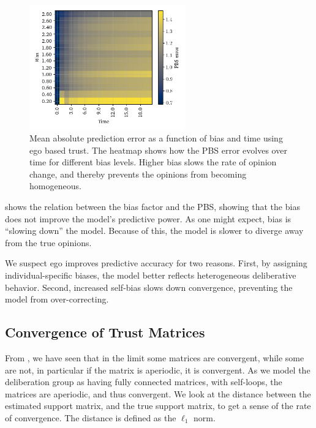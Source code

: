 \begin{figure}[ht]
	\centering

	\includegraphics[width=0.6\textwidth]{Figures/bias_time_imshow.png}
	\hspace{1em}
	\caption{Mean absolute prediction error as a function of bias and time using ego based trust. The heatmap shows how the PBS error evolves over time for different bias levels. Higher bias slows the rate of opinion change, and thereby prevents the opinions from becoming homogeneous.}
	\label{fig:bias_slowdown}
\end{figure}

 shows the relation between the bias factor and the
PBS, showing that the bias does not improve the model's predictive power. As
one might expect, bias is ``slowing down'' the model. Because of this, the
model is slower to diverge away from the true opinions.


We suspect ego improves predictive accuracy for two reasons. First, by
assigning individual-specific biases, the model better reflects heterogeneous
deliberative behavior. Second, increased self-bias slows down convergence,
preventing the model from over-correcting.

\subsection{Convergence of Trust Matrices}

From , we have seen that in the limit some matrices are
convergent, while some are not, in particular if the matrix is aperiodic, it
is convergent. As we model the deliberation group as having fully connected
matrices, with self-loops, the matrices are aperiodic, and thus convergent. We look at the
distance between the estimated support matrix, and the true support matrix, to
get a sense of the rate of convergence. The distance is defined as the
$\ell_1$ norm.

